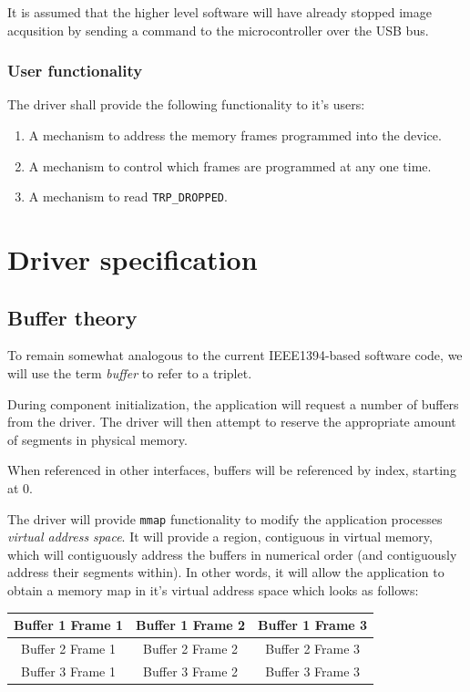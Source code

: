 \documentclass[12pt]{article}
\begin{document}
It is assumed that the higher level software will have already stopped image acqusition by sending a command to the microcontroller over the USB bus.

\subsubsection{User functionality}

The driver shall provide the following functionality to it's users:

\begin{enumerate}
\item A mechanism to address the memory frames programmed into the device.
\item A mechanism to control which frames are programmed at any one time.
\item A mechanism to read \texttt{TRP\_DROPPED}.
\end{enumerate}

\section{Driver specification}

\subsection{Buffer theory}

To remain somewhat analogous to the current IEEE1394-based software code, we will use the term \textit{buffer} to refer to a triplet.

During component initialization, the application will request a number of buffers from the driver. The driver will then attempt to reserve the appropriate amount of segments in physical memory.

When referenced in other interfaces, buffers will be referenced by index, starting at 0.

The driver will provide \texttt{mmap} functionality to modify the application processes \textit{virtual address space}. It will provide a region, contiguous in virtual memory, which will contiguously address the buffers in numerical order (and contiguously address their segments within). In other words, it will allow the application to obtain a memory map in it's virtual address space which looks as follows:

\begin{tabular}{|c|c|c|}\hline
Buffer 1 Frame 1 & Buffer 1 Frame 2 & Buffer 1 Frame 3 \\ \hline
Buffer 2 Frame 1 & Buffer 2 Frame 2 & Buffer 2 Frame 3 \\ \hline
Buffer 3 Frame 1 & Buffer 3 Frame 2 & Buffer 3 Frame 3 \\ \hline
\end{tabular}
\end{document}
